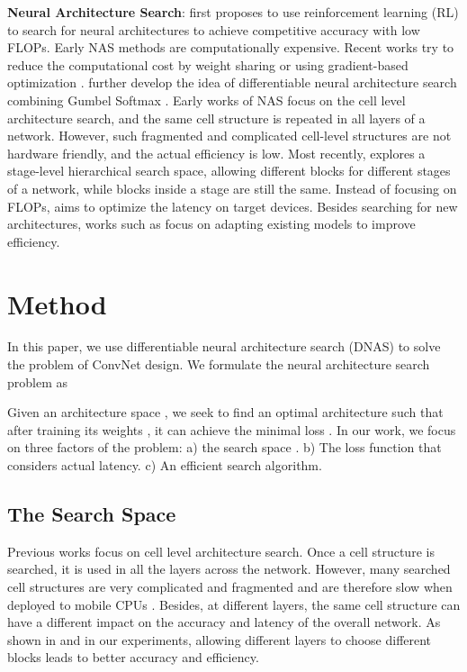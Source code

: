 \documentclass[10pt,twocolumn,letterpaper]{article}
\begin{document}
\textbf{Neural Architecture Search}: \cite{zoph2016neural, zoph2017learning} first proposes to use reinforcement learning (RL) to search for neural architectures to achieve competitive accuracy with low FLOPs. Early NAS methods are computationally expensive. Recent works try to reduce the computational cost by weight sharing \cite{pham2018efficient} or using gradient-based optimization \cite{liu2018darts}. \cite{wu2018mixed, anonymous2019snas:} further develop the idea of differentiable neural architecture search combining Gumbel Softmax \cite{jang2016categorical}. Early works of NAS \cite{zoph2017learning,pham2018efficient,liu2018darts} focus on the cell level architecture search, and the same cell structure is repeated in all layers of a network. However, such fragmented and complicated cell-level structures are not hardware friendly, and the actual efficiency is low. Most recently, \cite{tan2018mnasnet} explores a stage-level hierarchical search space, allowing different blocks for different stages of a network, while blocks inside a stage are still the same. Instead of focusing on FLOPs, \cite{tan2018mnasnet} aims to optimize the latency on target devices.  Besides searching for new architectures, works such as \cite{yang2018netadapt, he2018amc} focus on adapting existing models to improve efficiency.  


\section{Method}
In this paper, we use differentiable neural architecture search (DNAS) to solve the problem of ConvNet design. We formulate the neural architecture search problem as

Given an architecture space , we seek to find an optimal architecture  such that after training its weights , it can achieve the minimal loss . In our work, we focus on three factors of the problem: a) the search space . b) The loss function  that considers actual latency. c) An efficient search algorithm.

\subsection{The Search Space}
\label{sec:search_space}
Previous works \cite{zoph2016neural,zoph2017learning,pham2018efficient,liu2017progressive,liu2018darts} focus on cell level architecture search. Once a cell structure is searched, it is used in all the layers across the network. However, many searched cell structures are very complicated and fragmented and are therefore slow when deployed to mobile CPUs \cite{sandler2018mobilenetv2,ma2018shufflenet}. Besides, at different layers, the same cell structure can have a different impact on the accuracy and latency of the overall network. As shown in \cite{tan2018mnasnet} and in our experiments, allowing different layers to choose different blocks leads to better accuracy and efficiency. 
\end{document}
